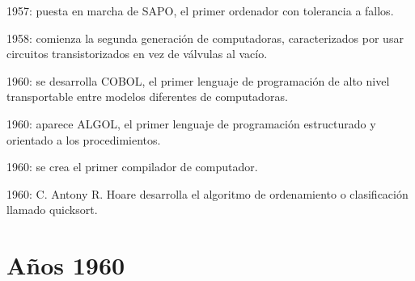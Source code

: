 \documentclass{article}
\begin{document}
{    \item 1957: puesta en marcha de SAPO, el primer ordenador con tolerancia a fallos.
    
    \item 1958: comienza la segunda generación de computadoras, caracterizados por usar circuitos transistorizados en vez de válvulas al vacío.
    
    \item 1960: se desarrolla COBOL, el primer lenguaje de programación de alto nivel transportable entre modelos diferentes de computadoras.
    
    \item 1960: aparece ALGOL, el primer lenguaje de programación estructurado y orientado a los procedimientos.
    
    \item 1960: se crea el primer compilador de computador.
    
    \item 1960: C. Antony R. Hoare desarrolla el algoritmo de ordenamiento o clasificación llamado quicksort.
}




\section{Años 1960}
\end{document}
